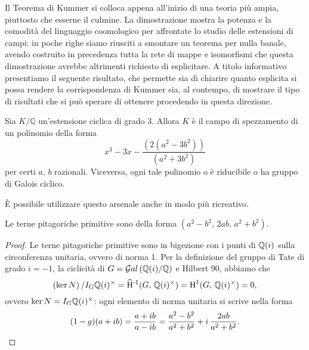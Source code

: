 Il Teorema di Kummer si colloca appena all'inizio di una teoria più ampia, piuttosto che esserne il culmine. La dimostrazione mostra la potenza e la comodità del linguaggio coomologico per affrontate lo studio delle estensioni di campi: in poche righe siamo riusciti a smontare un teorema per nulla banale, avendo costruito in precedenza tutta la rete di mappe e isomorfismi che questa dimostrazione avrebbe altrimenti richiesto di esplicitare. A titolo informativo presentiamo il seguente risultato, che permette sia di chiarire quanto esplicita si possa rendere la corrispondenza di Kummer sia, al contempo, di mostrare il tipo di risultati che si può sperare di ottenere procedendo in questa direzione.

\begin{proposition}
	Sia $K/\mathbb{Q}$ un'estensione ciclica di grado 3. Allora $ K $ è il campo di spezzamento di un polinomio della forma $$ x^3-3x-\frac{(2(a^2-3b^2))}{(a^2+3b^2)} $$ per certi $ a,\, b $ razionali. Viceversa, ogni tale polinomio o è riducibile o ha gruppo di Galois ciclico.
\end{proposition} 

È possibile utilizzare questo arsenale anche in modo più ricreativo.

\begin{theorem}
	Le terne pitagoriche primitive sono della forma $ (a^2-b^2,\, 2ab,\, a^2+b^2) $.
\end{theorem}

\begin{proof}
	Le terne pitagoriche primitive sono in bigezione con i punti di $ \mathbb{Q}(i) $ sulla circonferenza unitaria, ovvero di norma 1. Per la definizione del gruppo di Tate di grado $ i = -1 $, la ciclicità di $ G = \mathcal{G}al\left( \mathbb{Q}(i)/\mathbb{Q} \right) $ e Hilbert 90, abbiamo che
	\[  \left(\ker N\right) / I_G \mathbb{Q}(i)^\times = \operatorname{\widehat{H}^{-1}}(G, \, \mathbb{Q}(i)^\times) = \operatorname{H}^1(G, \, \mathbb{Q}(i)^\times) = 0, \]
	ovvero $ \ker N = I_G \mathbb{Q}(i)^\times $: ogni elemento di norma unitaria si scrive nella forma
	\[ (1-g) (a+ib) = \frac{a+ib}{a-ib} = \frac{a^2 -b^2}{a^2 + b^2} + i \, \frac{2ab}{a^2 + b^2}. \qedhere \]
\end{proof}

